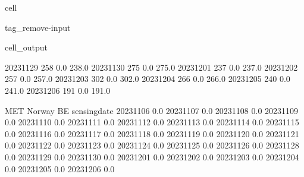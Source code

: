 \documentclass[letterpaper,10pt,english]{jupyterBook}
\begin{document}
\begin{sphinxuseclass}{cell}
\begin{sphinxuseclass}{tag_remove-input}
\begin{sphinxVerbatimOutput}
\begin{sphinxuseclass}{cell_output}
\begin{sphinxVerbatim}[commandchars=\\\{\}]
2023\PYGZhy{}11\PYGZhy{}29              258                    0.0                  238.0   
2023\PYGZhy{}11\PYGZhy{}30              275                    0.0                  275.0   
2023\PYGZhy{}12\PYGZhy{}01              237                    0.0                  237.0   
2023\PYGZhy{}12\PYGZhy{}02              257                    0.0                  257.0   
2023\PYGZhy{}12\PYGZhy{}03              302                    0.0                  302.0   
2023\PYGZhy{}12\PYGZhy{}04              266                    0.0                  266.0   
2023\PYGZhy{}12\PYGZhy{}05              240                    0.0                  241.0   
2023\PYGZhy{}12\PYGZhy{}06              191                    0.0                  191.0   

              MET Norway BE  
sensing\PYGZus{}date                 
2023\PYGZhy{}11\PYGZhy{}06              0.0  
2023\PYGZhy{}11\PYGZhy{}07              0.0  
2023\PYGZhy{}11\PYGZhy{}08              0.0  
2023\PYGZhy{}11\PYGZhy{}09              0.0  
2023\PYGZhy{}11\PYGZhy{}10              0.0  
2023\PYGZhy{}11\PYGZhy{}11              0.0  
2023\PYGZhy{}11\PYGZhy{}12              0.0  
2023\PYGZhy{}11\PYGZhy{}13              0.0  
2023\PYGZhy{}11\PYGZhy{}14              0.0  
2023\PYGZhy{}11\PYGZhy{}15              0.0  
2023\PYGZhy{}11\PYGZhy{}16              0.0  
2023\PYGZhy{}11\PYGZhy{}17              0.0  
2023\PYGZhy{}11\PYGZhy{}18              0.0  
2023\PYGZhy{}11\PYGZhy{}19              0.0  
2023\PYGZhy{}11\PYGZhy{}20              0.0  
2023\PYGZhy{}11\PYGZhy{}21              0.0  
2023\PYGZhy{}11\PYGZhy{}22              0.0  
2023\PYGZhy{}11\PYGZhy{}23              0.0  
2023\PYGZhy{}11\PYGZhy{}24              0.0  
2023\PYGZhy{}11\PYGZhy{}25              0.0  
2023\PYGZhy{}11\PYGZhy{}26              0.0  
2023\PYGZhy{}11\PYGZhy{}28              0.0  
2023\PYGZhy{}11\PYGZhy{}29              0.0  
2023\PYGZhy{}11\PYGZhy{}30              0.0  
2023\PYGZhy{}12\PYGZhy{}01              0.0  
2023\PYGZhy{}12\PYGZhy{}02              0.0  
2023\PYGZhy{}12\PYGZhy{}03              0.0  
2023\PYGZhy{}12\PYGZhy{}04              0.0  
2023\PYGZhy{}12\PYGZhy{}05              0.0  
2023\PYGZhy{}12\PYGZhy{}06              0.0  
\end{sphinxVerbatim}

\end{sphinxuseclass}\end{sphinxVerbatimOutput}

\end{sphinxuseclass}
\end{sphinxuseclass}
\end{document}
